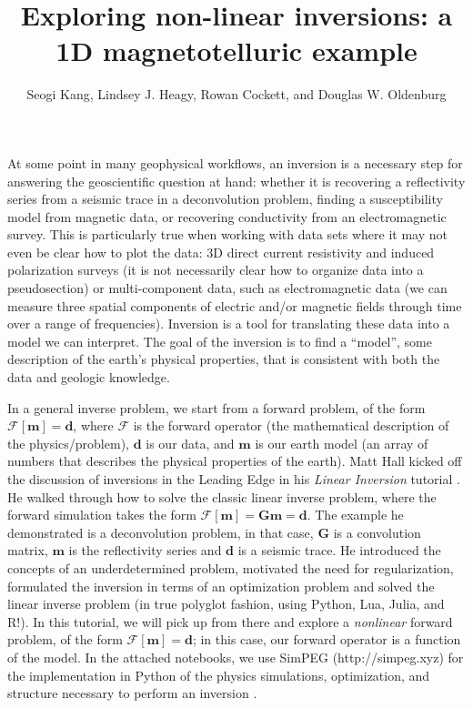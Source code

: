 \documentclass[11pt,oneside]{article}
\begin{document}
\title{Exploring non-linear inversions: a 1D magnetotelluric example}
\author{Seogi Kang, Lindsey J. Heagy, Rowan Cockett, and Douglas W. Oldenburg}

\maketitle
At some point in many geophysical workflows, an inversion is a necessary step for answering the geoscientific question at hand: whether it is recovering a reflectivity series from a seismic trace in a deconvolution problem, finding a susceptibility model from magnetic data, or recovering conductivity from an electromagnetic survey. This is particularly true when working with data sets where it may not even be clear how to plot the data: 3D direct current resistivity and induced polarization surveys (it is not necessarily clear how to organize data into a pseudosection) or multi-component data, such as electromagnetic data (we can measure three spatial components of electric and/or magnetic fields through time over a range of frequencies). Inversion is a tool for translating these data into a model we can interpret. The goal of the inversion is to find a ``model'', some description of the earth’s physical properties, that is consistent with both the data and geologic knowledge.

In a general inverse problem, we start from a forward problem, of the form $\mathcal{F}[\mathbf{m}] = \mathbf{d}$, where $\mathcal{F}$ is the forward operator (the mathematical description of the physics/problem), $\mathbf{d}$ is our data, and $\mathbf{m}$ is our earth model (an array of numbers that describes the physical properties of the earth). Matt Hall kicked off the discussion of inversions in the Leading Edge in his \emph{Linear Inversion} tutorial \citep{HallTutorial}. He walked through how to solve the classic linear inverse problem, where the forward simulation takes the form $\mathcal{F}[\mathbf{m}] = \mathbf{G}\mathbf{m} = \mathbf{d}$. The example he demonstrated is a deconvolution problem, in that case, $\mathbf{G}$ is a convolution matrix, $\mathbf{m}$ is the reflectivity series and $\mathbf{d}$ is a seismic trace. He introduced the concepts of an underdetermined problem, motivated the need for regularization, formulated the inversion in terms of an optimization problem and solved the linear inverse problem (in true polyglot fashion, using Python, Lua, Julia, and R!). In this tutorial, we will pick up from there and explore a \emph{nonlinear} forward problem, of the form $\mathcal{F}[\mathbf{m}] = \mathbf{d}$; in this case, our forward operator is a function of the model. In the attached notebooks, we use SimPEG (http://simpeg.xyz) for the implementation in Python of the physics simulations, optimization, and structure necessary to perform an inversion \citep{SimPEGPaper}.
\end{document}

